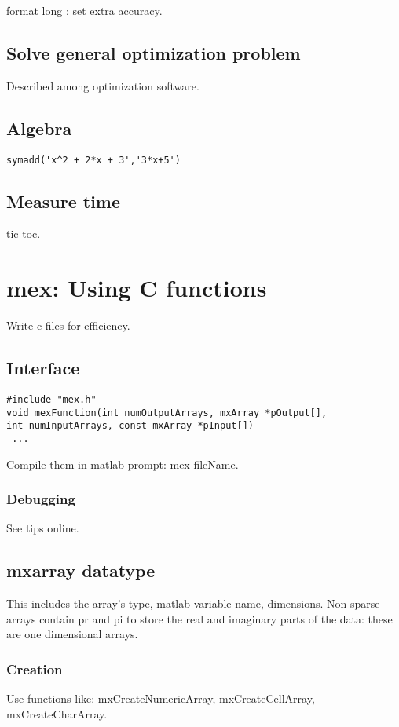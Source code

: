 \documentclass[oneside, article]{memoir}
\begin{document}
format long : set extra accuracy.

\subsection{Solve general optimization problem}
Described among optimization software.

\subsection{Algebra}
\begin{verbatim}
symadd('x^2 + 2*x + 3','3*x+5')
\end{verbatim}

\subsection{Measure time}
tic toc.

\section{mex: Using C functions}
Write c files for efficiency. 

\subsection{Interface}
\begin{verbatim}
#include "mex.h"
void mexFunction(int numOutputArrays, mxArray *pOutput[],
int numInputArrays, const mxArray *pInput[])
 ...
\end{verbatim}

Compile them in matlab prompt: mex fileName.

\subsubsection{Debugging}
See tips online.

\subsection{mxarray datatype}
This includes the array's type, matlab variable name, dimensions. Non-sparse arrays contain pr and pi to store the real and imaginary parts of the data: these are one dimensional arrays.

\subsubsection{Creation}
Use functions like: mxCreateNumericArray, mxCreateCellArray, mxCreateCharArray.
\end{document}

